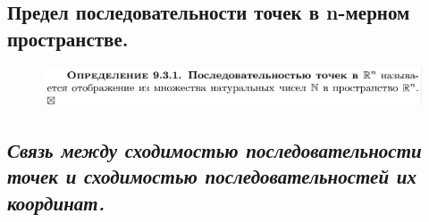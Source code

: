 \documentclass{article}
\newcommand{\ii}{\textit}
\begin{document}
\subsection{Предел последовательности точек в n-мерном пространстве.}
\begin{figure}[h!]
    \centering
    \includegraphics[width=\textwidth]{2.png}
    \vspace{-1cm}
\end{figure}
\begin{figure}[h!]
    \centering
    \vspace{-1cm}
\end{figure}
\newpage
\subsection{\ii{Связь между сходимостью последовательности точек и сходимостью последовательностей их координат.}}
\begin{figure}[h!]
    \centering
    \vspace{-1cm}
\end{figure}
\newpage
\end{document}
